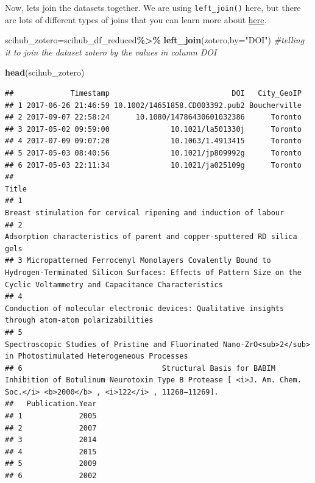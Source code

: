 \documentclass[
]{article}
\newenvironment{Shaded}{\begin{snugshade}}{\end{snugshade}}
\newcommand{\AttributeTok}[1]{\textcolor[rgb]{0.13,0.29,0.53}{#1}}
\newcommand{\CommentTok}[1]{\textcolor[rgb]{0.56,0.35,0.01}{\textit{#1}}}
\newcommand{\FunctionTok}[1]{\textcolor[rgb]{0.13,0.29,0.53}{\textbf{#1}}}
\newcommand{\NormalTok}[1]{#1}
\newcommand{\OtherTok}[1]{\textcolor[rgb]{0.56,0.35,0.01}{#1}}
\newcommand{\SpecialCharTok}[1]{\textcolor[rgb]{0.81,0.36,0.00}{\textbf{#1}}}
\newcommand{\StringTok}[1]{\textcolor[rgb]{0.31,0.60,0.02}{#1}}
\begin{document}
Now, lets join the datasets together. We are using \texttt{left\_join()}
here, but there are lots of different types of joins that you can learn
more about
\href{https://r4ds.hadley.nz/joins.html\#sec-mutating-joins}{here}.

\begin{Shaded}
\begin{Highlighting}[]
\NormalTok{scihub\_zotero}\OtherTok{=}\NormalTok{scihub\_df\_reduced}\SpecialCharTok{\%\textgreater{}\%}
  \FunctionTok{left\_join}\NormalTok{(zotero,}\AttributeTok{by=}\StringTok{"DOI"}\NormalTok{) }\CommentTok{\#telling it to join the dataset zotero by the values in column DOI }

\FunctionTok{head}\NormalTok{(scihub\_zotero)}
\end{Highlighting}
\end{Shaded}

\begin{verbatim}
##             Timestamp                            DOI   City_GeoIP
## 1 2017-06-26 21:46:59 10.1002/14651858.CD003392.pub2 Boucherville
## 2 2017-09-07 22:58:24      10.1080/14786430601032386      Toronto
## 3 2017-05-02 09:59:00              10.1021/la501330j      Toronto
## 4 2017-07-09 09:07:20              10.1063/1.4913415      Toronto
## 5 2017-05-03 08:40:56              10.1021/jp809992g      Toronto
## 6 2017-05-03 22:11:34              10.1021/ja025109g      Toronto
##                                                                                                                                                                              Title
## 1                                                                                                                 Breast stimulation for cervical ripening and induction of labour
## 2                                                                                                         Adsorption characteristics of parent and copper-sputtered RD silica gels
## 3 Micropatterned Ferrocenyl Monolayers Covalently Bound to Hydrogen-Terminated Silicon Surfaces: Effects of Pattern Size on the Cyclic Voltammetry and Capacitance Characteristics
## 4                                                                              Conduction of molecular electronic devices: Qualitative insights through atom-atom polarizabilities
## 5                                                                Spectroscopic Studies of Pristine and Fluorinated Nano-ZrO<sub>2</sub> in Photostimulated Heterogeneous Processes
## 6                                Structural Basis for BABIM Inhibition of Botulinum Neurotoxin Type B Protease [ <i>J. Am. Chem. Soc.</i> <b>2000</b> , <i>122</i> , 11268−11269].
##   Publication.Year
## 1             2005
## 2             2007
## 3             2014
## 4             2015
## 5             2009
## 6             2002
\end{verbatim}
\end{document}
